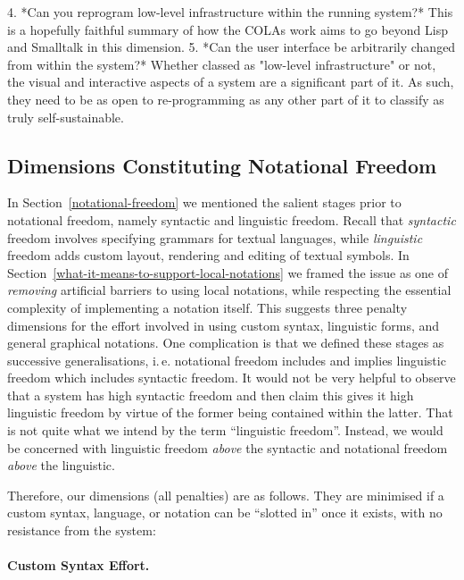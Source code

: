 \documentclass[ twoside,openright,titlepage,numbers=noenddot,headinclude,footinclude,cleardoublepage=empty,abstract=on,
                BCOR=5mm,paper=a4,fontsize=11pt
                ]{scrreprt}
\newcommand{\ie}{i.\,e.}
\theoremstyle{definition}
\begin{document}
{4. *Can you reprogram low-level infrastructure within the running system?* This is a hopefully faithful summary of how the COLAs work aims to go beyond Lisp and Smalltalk in this dimension.
5. *Can the user interface be arbitrarily changed from within the system?* Whether classed as "low-level infrastructure" or not, the visual and interactive aspects of a system are a significant part of it. As such, they need to be as open to re-programming as any other part of it to classify as truly self-sustainable.}

\hypertarget{dimensions-constituting-notational-freedom}{\subsection{Dimensions Constituting Notational
Freedom}\label{dimensions-constituting-notational-freedom}}

In Section~\ref{notational-freedom} we mentioned the salient stages
prior to notational freedom, namely syntactic and linguistic freedom.
Recall that \emph{syntactic} freedom involves specifying grammars for
textual languages, while \emph{linguistic} freedom adds custom layout,
rendering and editing of textual symbols. In
Section~\ref{what-it-means-to-support-local-notations} we framed the
issue as one of \emph{removing} artificial barriers to using local
notations, while respecting the essential complexity of implementing a
notation itself. This suggests three penalty dimensions for the effort
involved in using custom syntax, linguistic forms, and general graphical
notations. One complication is that we defined these stages as
successive generalisations, \ie{} notational freedom includes and
implies linguistic freedom which includes syntactic freedom. It would
not be very helpful to observe that a system has high syntactic freedom
and then claim this gives it high linguistic freedom by virtue of the
former being contained within the latter. That is not quite what we
intend by the term ``linguistic freedom''. Instead, we would be
concerned with linguistic freedom \emph{above} the syntactic and
notational freedom \emph{above} the linguistic.

Therefore, our dimensions (all penalties) are as follows. They are
minimised if a custom syntax, language, or notation can be ``slotted
in'' once it exists, with no resistance from the system:

\paragraph{Custom Syntax Effort.}
\end{document}
